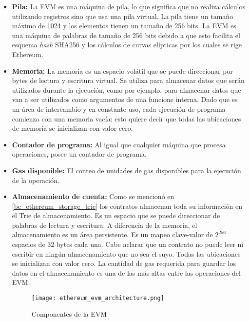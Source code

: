 \begin{itemize}
  \item \textbf{Pila:} La EVM es una máquina de pila, lo que significa que no realiza cálculos utilizando registros sino que usa una pila virtual. La pila tiene un tamaño máximo de 1024 y los elementos tienen un tamaño de 256 bits. La EVM es una máquina de palabras de tamaño de 256 bits debido a que esto facilita el esquema \textit{hash} SHA256 y los cálculos de curvas elípticas por los cuales se rige Ethereum.
  \item \textbf{Memoria:} La memoria es un espacio volátil que se puede direccionar por bytes de lectura y escritura virtual. Se utiliza para almacenar datos que serán utilizados durante la ejecución, como por ejemplo, para almacenar datos que van a ser utilizados como argumentos de una funcione interna. Dado que es un área de intercambio y en constante uso, cada ejecución de programa comienza con una memoria vacía: esto quiere decir que todas las ubicaciones de memoria se inicializan con valor cero.
  \item \textbf{Contador de programa:} Al igual que cualquier máquina que procesa operaciones, posee un contador de programa.
  \item \textbf{Gas disponible:} El conteo de unidades de gas disponibles para la ejecución de la operación.
  \item \textbf{Almacenamiento de cuenta:} Como se mencionó en \ref{bc_ethereum_storage_trie} los contratos almacenan toda su información en el Trie de almacenamiento. Es un espacio que se puede direccionar de palabras de lectura y escritura. A diferencia de la memoria, el almacenamiento es un área persistente. Es un mapeo clave-valor de $2^{256}$ espacios de 32 bytes cada una. Cabe aclarar que un contrato no puede leer ni escribir en ningún almacenamiento que no sea el suyo. Todas las ubicaciones se inicializan con valor cero. La cantidad de gas requerida para guardar los datos en el almacenamiento es una de las más altas entre las operaciones del EVM.

\begin{figure}[H]
  \texttt{[image: ethereum\_evm\_architecture.png]}
  \centering
  \caption{Componentes de la EVM}
  \label{fig:merkle-ptricia-trie}
\end{figure}


\end{itemize}
